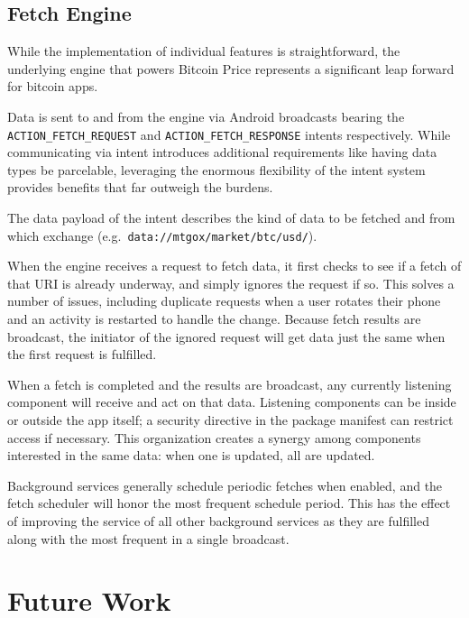 \documentclass[twocolumn]{article}
\newcommand{\app}{Bitcoin Price\xspace}
\newcommand{\platform}{Android\xspace}
\begin{document}
    \subsection*{Fetch Engine}

    While the implementation of individual features is straightforward, the
    underlying engine that powers \app represents a significant leap forward
    for bitcoin apps.

    Data is sent to and from the engine via \platform broadcasts bearing the
    \texttt{ACTION\_FETCH\_REQUEST} and \texttt{ACTION\_FETCH\_RESPONSE}
    intents respectively.  While communicating via intent introduces additional
    requirements like having data types be parcelable, leveraging the enormous
    flexibility of the intent system provides benefits that far outweigh the
    burdens.

    The data payload of the intent describes the kind of data to be fetched and
    from which exchange (e.g.\ \texttt{data://mtgox/market/btc/usd/}).

    When the engine receives a request to fetch data, it first checks to see if
    a fetch of that URI is already underway, and simply ignores the request if
    so.  This solves a number of issues, including duplicate requests when a
    user rotates their phone and an activity is restarted to handle the change.
    Because fetch results are broadcast, the initiator of the ignored request
    will get data just the same when the first request is fulfilled.

    When a fetch is completed and the results are broadcast, any currently
    listening component will receive and act on that data.  Listening
    components can be inside or outside the app itself; a security directive in
    the package manifest can restrict access if necessary.  This organization
    creates a synergy among components interested in the same data: when one is
    updated, all are updated.

    Background services generally schedule periodic fetches when enabled, and
    the fetch scheduler will honor the most frequent schedule period.  This has
    the effect of improving the service of all other background services as
    they are fulfilled along with the most frequent in a single broadcast.

    \section*{Future Work}
\end{document}
